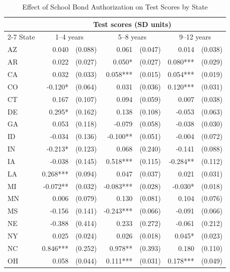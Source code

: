 \begin{table}[htbp]
    \centering
    \caption{Effect of School Bond Authorization on Test Scores by State}
    \label{tab:state_test_scores}
    \begin{threeparttable}
    \begin{tabular}{l*{3}{r@{\hspace{3pt}}l}}
    \toprule
    & \multicolumn{6}{c}{Test scores (SD units)} \\
    \cmidrule(lr){2-7}
    State & \multicolumn{2}{c}{1--4 years} & \multicolumn{2}{c}{5--8 years} & \multicolumn{2}{c}{9--12 years} \\
    \midrule
    AZ & 0.040 & (0.088) & 0.061 & (0.047) & 0.014 & (0.038) \\
    AR & 0.022 & (0.027) & 0.050* & (0.027) & 0.080*** & (0.029) \\
    CA & 0.032 & (0.033) & 0.058*** & (0.015) & 0.054*** & (0.019) \\
    CO & -0.120* & (0.064) & 0.031 & (0.036) & 0.120*** & (0.031) \\
    CT & 0.167 & (0.107) & 0.094 & (0.059) & 0.007 & (0.038) \\
    DE & 0.295* & (0.162) & 0.138 & (0.108) & -0.053 & (0.063) \\
    GA & 0.053 & (0.118) & -0.079 & (0.058) & -0.038 & (0.030) \\
    ID & -0.034 & (0.136) & -0.100** & (0.051) & -0.004 & (0.072) \\
    IN & -0.213* & (0.123) & 0.068 & (0.240) & -0.141 & (0.088) \\
    IA & -0.038 & (0.145) & 0.518*** & (0.115) & -0.284** & (0.112) \\
    LA & 0.268*** & (0.094) & 0.047 & (0.037) & 0.021 & (0.031) \\
    MI & -0.072** & (0.032) & -0.083*** & (0.028) & -0.030* & (0.018) \\
    MN & 0.006 & (0.079) & 0.130 & (0.081) & 0.104 & (0.076) \\
    MS & -0.156 & (0.141) & -0.243*** & (0.066) & -0.091 & (0.066) \\
    NE & -0.388 & (0.414) & 0.233 & (0.272) & -0.061 & (0.212) \\
    NY & 0.025 & (0.024) & 0.026 & (0.018) & 0.045* & (0.023) \\
    NC & 0.846*** & (0.252) & 0.978** & (0.393) & 0.180 & (0.110) \\
    OH & 0.058 & (0.044) & 0.111*** & (0.031) & 0.178*** & (0.049) \\

\end{tabular}
\end{threeparttable}
\end{table}
